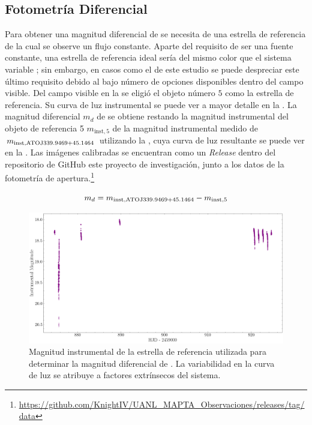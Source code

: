 \subsection{Fotometría Diferencial}
Para obtener una magnitud diferencial de \atoObjId se necesita de una estrella
de referencia de la cual se observe un flujo constante. Aparte del requisito de
ser una fuente constante, una estrella de referencia ideal sería del mismo color
que el sistema variable \atoObjIdNoSpace; sin embargo, en casos como el de este
estudio se puede despreciar este último requisito debido al bajo número de
opciones disponibles dentro del campo visible. Del campo visible en la
 se eligió el objeto número $5$ como la estrella de
referencia. Su curva de luz instrumental se puede ver a mayor detalle en la
. La magnitud diferencial $m_d$
de \atoObjId se obtiene restando la magnitud instrumental del objeto de
referencia 5 $m_{\mathrm{inst, 5}}$ de la magnitud instrumental medido de
\atoObjId $m_{\mathrm{inst, ATO J339.9469+45.1464 \space}}$ utilizando la
, cuya curva de luz resultante se puede
ver en la . Las imágenes calibradas se
encuentran como un \textit{Release} dentro del repositorio de GitHub este
proyecto de investigación, junto a los datos de la fotometría de
apertura.\footnote{\url{https://github.com/KnightIV/UANL_MAPTA_Observaciones/releases/tag/data}}

\begin{eqfloat}[!ht]
	\begin{equation}
		m_d = m_{\mathrm{inst, ATO J339.9469+45.1464 \space}} - m_{\mathrm{inst, 5}}
	\end{equation}
	\blankcaption
	\vspace{-0.5em}
	\label{ecuacionMagnitudDiferencial}
\end{eqfloat}

\begin{figure}[!ht]
	\centering
	\includegraphics[scale=0.44]{Observaciones/Secciones/Figures/Figura Magnitud Instrumental Estrella Referencia.png}
	\caption{Magnitud instrumental de la estrella de referencia utilizada para
	determinar la magnitud diferencial de \atoObjIdNoSpace. La variabilidad en
	la curva de luz se atribuye a factores extrínsecos del sistema.}
	\label{figuraCurvaLuzInstrumentalReferencia}
\end{figure}

